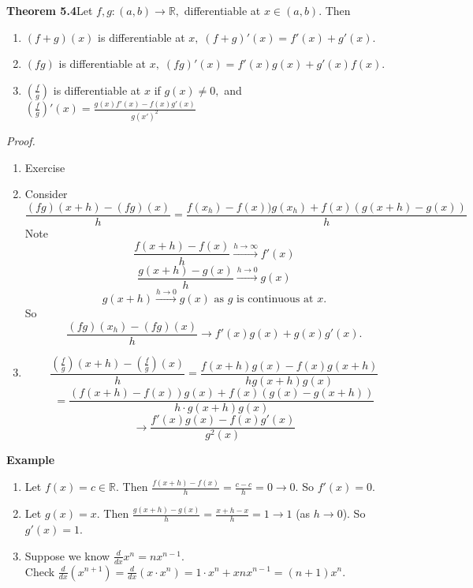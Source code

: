 \documentclass[12pt]{article}
\begin{document}
\vspace{1\baselineskip}
\begin{block}{\bf Theorem 5.4}Let $f,g\colon (a,b)\rightarrow\mathbb{R},$ differentiable at $x\in(a,b).$ Then
\begin{enumerate}[label=(\roman*)]
    \item $(f+g)(x)$ is differentiable at $x,\; (f+g)'(x)=f'(x)+g'(x).$
    \item $(fg)$ is differentiable at $x,\; (fg)'(x)=f'(x)g(x)+g'(x)f(x).$
    \item $\left(\frac{f}{g}\right)$ is differentiable at $x$ if $g(x)\neq 0,$ and $\left(\frac{f}{g}\right)'(x)=\frac{g(x)f'(x)-f(x)g'(x)}{g(x')^2}$
\end{enumerate}
\end{block}

\vspace{1\baselineskip}
\begin{block}{\sl Proof.}
\begin{enumerate}[label=(\roman*)]
    \item Exercise
    \item Consider $$\frac{(fg)(x+h)-(fg)(x)}{h} = \frac{f(x_h)-f(x))g(x_h)+f(x)(g(x+h)-g(x))}{h}$$
    Note $$\frac{f(x+h)-f(x)}{h}\xrightarrow{\text{$h\to\infty$}} f'(x)$$
    $$\frac{g(x+h)-g(x)}{h}\xrightarrow{\text{$h\to 0$}}  g(x)$$
    $$g(x+h) \xrightarrow{\text{$h\to 0$}} g(x)\text{ as $g$ is continuous at $x$.}$$
    So $$\frac{(fg)(x_h)-(fg)(x)}{h}\to f'(x)g(x)+g(x)g'(x).$$
    
    \item $$\frac{\left(\frac{f}{g}\right)(x+h)-\left(\frac{f}{g}\right)(x)}{h} = \frac{f(x+h)g(x)-f(x)g(x+h)}{hg(x+h)g(x)}$$
    $$=\frac{(f(x+h)-f(x))g(x)+f(x)(g(x)-g(x+h))}{h\cdot g(x+h)g(x)}$$
    $$\longrightarrow \frac{f'(x)g(x)-f(x)g'(x)}{g^2(x)}$$
\end{enumerate}
\end{block}

\vspace{1\baselineskip}
\begin{block}{\bf Example}
\begin{enumerate}[label=(\roman*)]
    \item Let $f(x)=c\in \mathbb{R}.$ Then $\frac{f(x+h)-f(x)}{h} = \frac{c-c}{h}=0\rightarrow 0.$ So $f'(x)=0$.
    \item Let $g(x)=x.$ Then $\frac{g(x+h)-g(x)}{h} = \frac{x+h-x}{h} = 1 \rightarrow 1$ (as $h\to 0$). So $g'(x)=1$.
    \item Suppose we know $\frac{d}{dx} x^n = nx^{n-1}.$ 
    \\Check $\frac{d}{dx}(x^{n+1}) = \frac{d}{dx} (x\cdot x^n) = 1\cdot x^n+xnx^{n-1}=(n+1)x^n.$
\end{enumerate}
\end{block}
\end{document}
